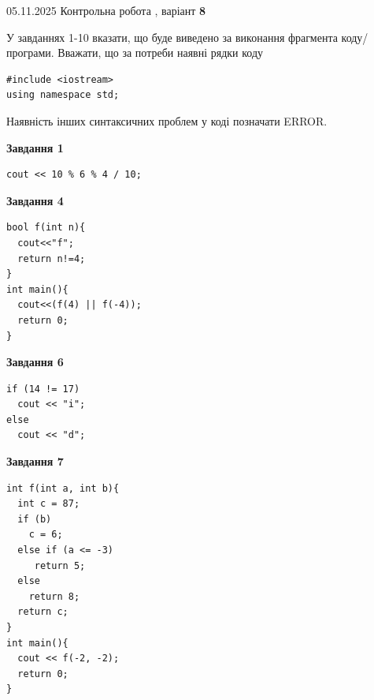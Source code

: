\documentclass[12pt, ukrainian]{article}
\begin{document}
\newpage

{\Large{05.11.2025 Контрольна робота , варіант  \No \textbf { 8 }\par}}
{
\begin {large}
У завданнях 1-10 вказати, що буде виведено за виконання фрагмента коду/про\-гра\-ми.
Вважати, що за потреби наявні рядки коду
\begin{verbatim}
#include <iostream>
using namespace std;
\end{verbatim}
Наявність інших синтаксичних проблем у коді позначати ERROR.

\begin{minipage}[t]{7.0cm}

\begin{center}
\textbf{Завдання 1}
\end{center}
\vspace{-8mm}

\begin{verbatim}
cout << 10 % 6 % 4 / 10;
\end{verbatim}



\begin{center}
\textbf{Завдання 4}
\end{center}
\vspace{-8mm}

\begin{verbatim}
bool f(int n){
  cout<<"f";
  return n!=4;
}
int main(){
  cout<<(f(4) || f(-4));
  return 0;
}
\end{verbatim}



\begin{center}
\textbf{Завдання 6}
\end{center}
\vspace{-8mm}

\begin{verbatim}
if (14 != 17)
  cout << "i";
else
  cout << "d";
\end{verbatim}



\begin{center}
\textbf{Завдання 7}
\end{center}
\vspace{-8mm}

\begin{verbatim}
int f(int a, int b){
  int c = 87;
  if (b)
    c = 6;
  else if (a <= -3)
     return 5;
  else
    return 8;
  return c;
}
int main(){
  cout << f(-2, -2);
  return 0;
}
\end{verbatim}


\end{minipage}
\end{large}}
\end{document}
